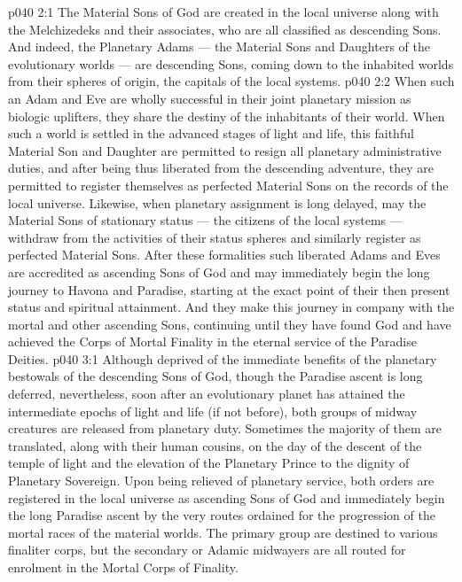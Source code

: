 \vs p040 2:1 The Material Sons of God are created in the local universe along with the Melchizedeks and their associates, who are all classified as descending Sons. And indeed, the Planetary Adams --- the Material Sons and Daughters of the evolutionary worlds --- are descending Sons, coming down to the inhabited worlds from their spheres of origin, the capitals of the local systems.
\vs p040 2:2 When such an Adam and Eve are wholly successful in their joint planetary mission as biologic uplifters, they share the destiny of the inhabitants of their world. When such a world is settled in the advanced stages of light and life, this faithful Material Son and Daughter are permitted to resign all planetary administrative duties, and after being thus liberated from the descending adventure, they are permitted to register themselves as perfected Material Sons on the records of the local universe. Likewise, when planetary assignment is long delayed, may the Material Sons of stationary status --- the citizens of the local systems --- withdraw from the activities of their status spheres and similarly register as perfected Material Sons. After these formalities such liberated Adams and Eves are accredited as ascending Sons of God and may immediately begin the long journey to Havona and Paradise, starting at the exact point of their then present status and spiritual attainment. And they make this journey in company with the mortal and other ascending Sons, continuing until they have found God and have achieved the Corps of Mortal Finality in the eternal service of the Paradise Deities.
\vs p040 3:1 Although deprived of the immediate benefits of the planetary bestowals of the descending Sons of God, though the Paradise ascent is long deferred, nevertheless, soon after an evolutionary planet has attained the intermediate epochs of light and life (if not before), both groups of midway creatures are released from planetary duty. Sometimes the majority of them are translated, along with their human cousins, on the day of the descent of the temple of light and the elevation of the Planetary Prince to the dignity of Planetary Sovereign. Upon being relieved of planetary service, both orders are registered in the local universe as ascending Sons of God and immediately begin the long Paradise ascent by the very routes ordained for the progression of the mortal races of the material worlds. The primary group are destined to various finaliter corps, but the secondary or Adamic midwayers are all routed for enrolment in the Mortal Corps of Finality.
